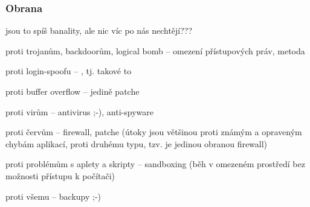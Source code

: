 \subsubsection*{Obrana}
jsou to spíš banality, ale nic víc po nás nechtějí???
\begin{pitemize}
    \item proti trojanům, backdoorům, logical bomb -- omezení přístupových práv, metoda 
    \item proti login-spoofu -- , tj. takové to 
    \item proti buffer overflow -- jedině patche
    \item proti virům -- antivirus ;-), anti-spyware 
    \item proti červům -- firewall, patche (útoky jsou většinou proti známým a opraveným chybám aplikací, proti druhému typu, tzv.  je jedinou obranou firewall)
    \item proti problémům s aplety a skripty -- sandboxing (běh v omezeném prostředí bez možnosti přístupu k počítači)
    \item proti všemu -- backupy ;-)
\end{pitemize}
